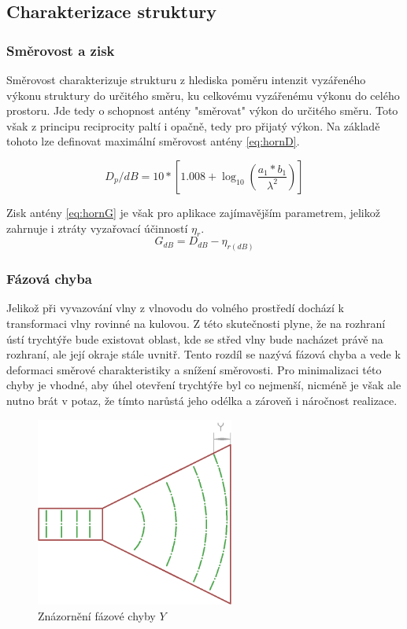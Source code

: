 \subsection{Charakterizace struktury}


\subsubsection{Směrovost a zisk}
Směrovost charakterizuje strukturu z hlediska poměru intenzit vyzářeného výkonu struktury do určitého směru, ku celkovému vyzářenému výkonu do celého prostoru. Jde tedy o schopnost antény "směrovat" výkon do určitého směru. Toto však z principu reciprocity paltí i opačně, tedy pro přijatý výkon. Na základě tohoto lze definovat maximální směrovost antény \ref{eq:hornD}.

\begin{equation}
D_p/dB = 10*[1.008+\log_{10}({\frac{a_1 * b_1}{\lambda^2}})]
\label{eq:hornD}
\end{equation}

\renewcommand{\figurename}{Obrázek}
Zisk antény \ref{eq:hornG} je však pro aplikace zajímavějším parametrem, jelikož zahrnuje i ztráty vyzařovací účinností $\eta_r$.
\begin{equation}
G_{dB} = D_{dB} - \eta_{r(dB)}
\label{eq:hornG}
\end{equation}

\subsubsection{Fázová chyba}
Jelikož při vyvazování vlny z vlnovodu do volného prostředí dochází k transformaci vlny rovinné na kulovou. Z této skutečnosti plyne, že na rozhraní ústí trychtýře bude existovat oblast, kde se střed vlny bude nacházet právě na rozhraní, ale její okraje stále uvnitř. Tento rozdíl se nazývá fázová chyba a vede k deformaci směrové charakteristiky a snížení směrovosti. Pro minimalizaci této chyby je vhodné, aby úhel otevření trychtýře byl co nejmenší, nicméně je však ale nutno brát v potaz, že tímto narůstá jeho odélka a zároveň i náročnost realizace.
\begin{figure}[h]
\begin{center}
\includegraphics[width=6.5cm]{pics/hornErr}
\caption{Znázornění fázové chyby $Y$}
\label{fig:HornErr}
\end{center}
\end{figure}

